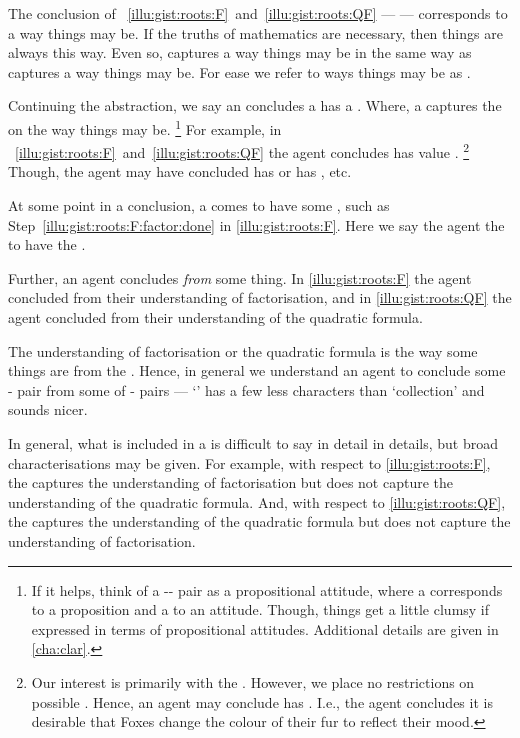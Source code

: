 \begin{note}
  The conclusion of ~\ref{illu:gist:roots:F}~and~\ref{illu:gist:roots:QF} --- \propM{\rootsCon{}} --- corresponds to a way things may be.
  If the truths of mathematics are necessary, then things are always this way.
  Even so, \propM{\rootsCon{}} captures a way things may be in the same way as  captures a way things may be.
  For ease we refer to ways things may be as \emph{}.

  Continuing the abstraction, we say an \agents{} concludes a  has a \emph{}.
  Where, a  captures the \agpe{} on the way things may be.%
  \footnote{
    If it helps, think of a -- pair as a propositional attitude, where a  corresponds to a proposition and a  to an attitude.
    Though, things get a little clumsy if expressed in terms of propositional attitudes.
    Additional details are given in \autoref{cha:clar}.
  }
  For example, in ~\ref{illu:gist:roots:F}~and~\ref{illu:gist:roots:QF} the agent concludes \propM{\rootsCon{}} has value .%
  \footnote{
    Our interest is primarily with the \val{} .
    However, we place no restrictions on possible .
    Hence, an agent may conclude  has \val{} .
    I.e., the agent concludes it is desirable that Foxes change the colour of their fur to reflect their mood.
  }
  Though, the agent may have concluded \propM{\rootsCon{}} has \val{}  or \propM{\rootsConBad{}} has \val{} , etc.

  At some point in a conclusion, a \prop{} comes to have some \val{}, such as Step~\ref{illu:gist:roots:F:factor:done} in \autoref{illu:gist:roots:F}.
  Here we say the agent \emph{\evals{}} the \prop{} to have the \val{}.
\end{note}


\begin{note}
  Further, an agent concludes \emph{from} some thing.
  In \autoref{illu:gist:roots:F} the agent concluded from their understanding of factorisation, and in \autoref{illu:gist:roots:QF} the agent concluded from their understanding of the quadratic formula.

  The \agents{} understanding of factorisation or the quadratic formula is the way some things are from the \agpe{}.
  Hence, in general we understand an agent to conclude some - pair from some \emph{\pool{}} of \prop{}-\val{} pairs --- `\pool{}' has a few less characters than `collection' and sounds nicer.

  In general, what is included in a \pool{} is difficult to say in detail in details, but broad characterisations may be given.
  For example, with respect to \autoref{illu:gist:roots:F}, the \pool{} captures the \agents{} understanding of factorisation but does not capture the \agents{} understanding of the quadratic formula.
  And, with respect to \autoref{illu:gist:roots:QF}, the \pool{} captures the \agents{} understanding of the quadratic formula but does not capture the \agents{} understanding of factorisation.
\end{note}



